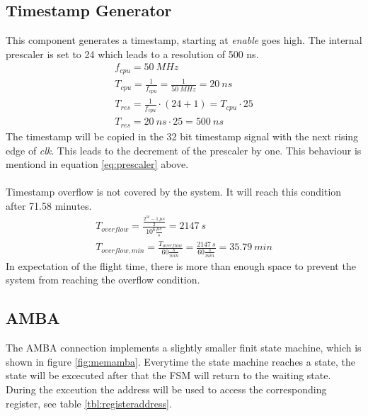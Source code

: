\subsection{Timestamp Generator}
This component generates a timestamp, starting at \textit{enable} goes high. The internal prescaler is set to 24 which leads to a resolution of 500 ns.
\begin{equation}
	\begin{split}
		f_{cpu} = 50~MHz \\ 
		T_{cpu} = \frac{1}{f_{cpu}} = \frac{1}{50~MHz} = 20~ns \\
		T_{res} = \frac{1}{f_{cpu}} \cdot \left(24 + 1\right) = T_{cpu} \cdot 25\\
		T_{res} = 20~ns \cdot 25 = 500 ~ ns
	\end{split}
\label{eq:prescaler}
\end{equation}
The timestamp will be copied in the 32 bit timestamp signal with the next rising edge of \textit{clk}. This leads to the decrement of the prescaler by one. This behaviour is mentiond in equation \ref{eq:prescaler} above.  \\ \\
Timestamp overflow is not covered by the system. It will reach this condition after 71.58 minutes.
\begin{equation}
	\begin{split}
		T_{overflow} =  \frac{\frac{2^{32} - 1 ~ \mu s}{2}}{10^6 \frac{\mu s}{s}} = 2147~s\\
		T_{overflow, min} = \frac{T_{overflow}}{60 \frac{s}{min}} = \frac{2147~s}{60 \frac{s}{min}} = 35.79 ~min
	\end{split}
\end{equation}
In expectation of the flight time, there is more than enough space to prevent the system from reaching the overflow condition. 
\subsection{AMBA}
 
\noindent
The AMBA connection implements a slightly smaller finit state machine, which is shown in figure \ref{fig:memamba}. 
Everytime the state machine reaches a state, the state will be excecuted after that the FSM will return to the waiting state. During the exceution the address will be used to access the corresponding register, see table \ref{tbl:registeraddress}.
